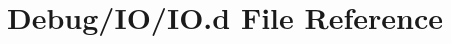 \hypertarget{_debug_2_i_o_2_i_o_8d}{\section{Debug/\-I\-O/\-I\-O.d File Reference}
\label{d9/d0e/_debug_2_i_o_2_i_o_8d}
}

